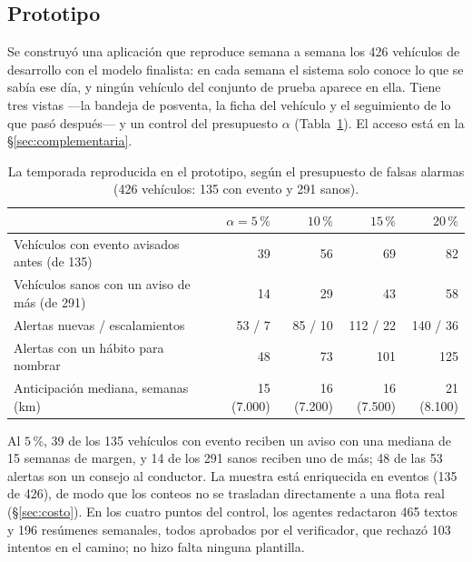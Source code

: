 \subsection{Prototipo}
\label{sec:prototipo}

Se construyó una aplicación que reproduce semana a semana los 426 vehículos de desarrollo con el modelo finalista: en cada
semana el sistema solo conoce lo que se sabía ese día, y ningún vehículo del conjunto de prueba aparece en ella. Tiene tres
vistas ---la bandeja de posventa, la ficha del vehículo y el seguimiento de lo que pasó después--- y un control del
presupuesto $\alpha$ (Tabla~\ref{tab:replay}). El acceso está en la \S\ref{sec:complementaria}.

\begin{table}[!htbp]
\centering
\caption{La temporada reproducida en el prototipo, según el presupuesto de falsas alarmas \tagdev{} (426 vehículos: 135 con
evento y 291 sanos).}
\label{tab:replay}
\small
\begin{tabular}{@{}lrrrr@{}}
\toprule
 & $\alpha = 5\,\%$ & $10\,\%$ & $15\,\%$ & $20\,\%$ \\
\midrule
Vehículos con evento avisados antes (de 135) & 39 & 56 & 69 & 82 \\
Vehículos sanos con un aviso de más (de 291) & 14 & 29 & 43 & 58 \\
Alertas nuevas / escalamientos & 53 / 7 & 85 / 10 & 112 / 22 & 140 / 36 \\
Alertas con un hábito para nombrar & 48 & 73 & 101 & 125 \\
Anticipación mediana, semanas (km) & 15 (7.000) & 16 (7.200) & 16 (7.500) & 21 (8.100) \\
\bottomrule
\end{tabular}
\end{table}

Al $5\,\%$, 39 de los 135 vehículos con evento reciben un aviso con una mediana de 15 semanas de margen, y 14 de los 291
sanos reciben uno de más; 48 de las 53 alertas son un consejo al conductor. La muestra está enriquecida en eventos (135 de
426), de modo que los conteos no se trasladan directamente a una flota real (\S\ref{sec:costo}). En los cuatro puntos del
control, los agentes redactaron 465 textos y 196 resúmenes semanales, todos aprobados por el verificador, que rechazó 103
intentos en el camino; no hizo falta ninguna plantilla.
